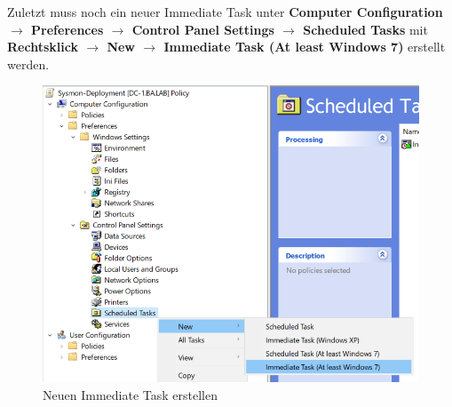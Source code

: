 Zuletzt muss noch ein neuer Immediate Task unter \textbf{Computer Configuration $\rightarrow$ Preferences $\rightarrow$ Control Panel Settings $\rightarrow$ Scheduled Tasks} mit \textbf{Rechtsklick $\rightarrow$ New $\rightarrow$ Immediate Task (At least Windows 7)} erstellt werden.
\begin{figure}[H]
    \centering
    \includegraphics[width=\linewidth]{../img/sysmon/new-scheduled-task.png}
    \caption{Neuen Immediate Task erstellen}
\end{figure}

